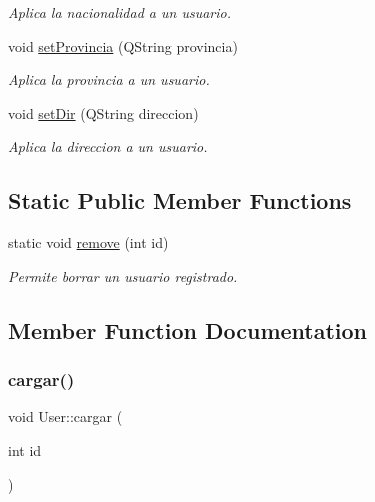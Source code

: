 \begin{DoxyCompactItemize}
\begin{DoxyCompactList}\small\item\em Aplica la nacionalidad a un usuario. \end{DoxyCompactList}\item 
void \mbox{\hyperlink{classUser_ad5fa7528ea5397868f5cf2ca99fef6cb}{set\+Provincia}} (Q\+String provincia)
\begin{DoxyCompactList}\small\item\em Aplica la provincia a un usuario. \end{DoxyCompactList}\item 
void \mbox{\hyperlink{classUser_a4b9aee0b43928b561f11d95299af370b}{set\+Dir}} (Q\+String direccion)
\begin{DoxyCompactList}\small\item\em Aplica la direccion a un usuario. \end{DoxyCompactList}\end{DoxyCompactItemize}
\subsection*{Static Public Member Functions}
\begin{DoxyCompactItemize}
\item 
static void \mbox{\hyperlink{classUser_a7c4b278350236406ce9dcd6b8f707f47}{remove}} (int id)
\begin{DoxyCompactList}\small\item\em Permite borrar un usuario registrado. \end{DoxyCompactList}\end{DoxyCompactItemize}


\subsection{Member Function Documentation}
\mbox{\label{classUser_a3d1f98d7ddb605391b6d2220747c2bd5}} 
\subsubsection{\texorpdfstring{cargar()}{cargar()}}
{\footnotesize\ttfamily void User\+::cargar (\begin{DoxyParamCaption}\item[{int}]{id }\end{DoxyParamCaption})}




